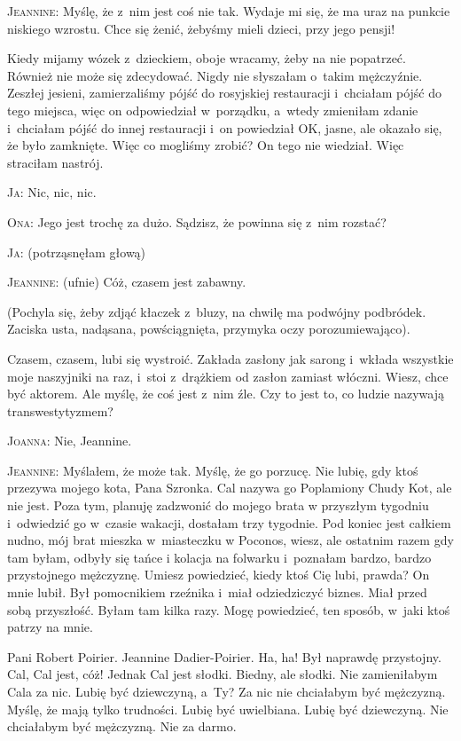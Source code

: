 \documentclass[oneside,polish,12pt,sfheadings]{mwbk}
\begin{document}
\textsc{Jeannine}: Myślę, że z~nim jest coś nie tak. Wydaje mi się, że ma uraz
na punkcie niskiego wzrostu. Chce się żenić, żebyśmy mieli dzieci,
przy jego pensji!

Kiedy mijamy wózek z~dzieckiem, oboje wracamy, żeby na nie popatrzeć.
Również nie może się zdecydować. Nigdy nie słyszałam o~takim mężczyźnie.
Zeszłej jesieni, zamierzaliśmy pójść do rosyjskiej restauracji i~chciałam
pójść do tego miejsca, więc on odpowiedział w~porządku, a~wtedy zmieniłam
zdanie i~chciałam pójść do innej restauracji i~on powiedział OK, jasne,
ale okazało się, że było zamknięte. Więc co mogliśmy zrobić? On tego
nie wiedział. Więc straciłam nastrój.

\textsc{Ja}: Nic, nic, nic.

\textsc{Ona}: Jego jest trochę za dużo. Sądzisz, że powinna się z~nim rozstać?

\textsc{Ja}: (potrząsnęłam głową)

\textsc{Jeannine}: (ufnie) Cóż, czasem jest zabawny.

(Pochyla się, żeby zdjąć kłaczek z~bluzy, na chwilę ma podwójny podbródek.
Zaciska usta, nadąsana, powściągnięta, przymyka oczy porozumiewająco).

Czasem, czasem, lubi się wystroić. Zakłada zasłony jak sarong i~wkłada
wszystkie moje naszyjniki na raz, i~stoi z~drążkiem od zasłon zamiast
włóczni. Wiesz, chce być aktorem. Ale myślę, że coś jest z~nim źle.
Czy to jest to, co ludzie nazywają transwestytyzmem?

\textsc{Joanna}: Nie, Jeannine.

\textsc{Jeannine}: Myślałem, że może tak. Myślę, że go porzucę. Nie lubię,
gdy ktoś przezywa mojego kota, Pana Szronka. Cal nazywa go Poplamiony
Chudy Kot, ale nie jest. Poza tym, planuję zadzwonić do mojego brata
w przyszłym tygodniu i~odwiedzić go w~czasie wakacji, dostałam trzy
tygodnie. Pod koniec jest całkiem nudno, mój brat mieszka w~miasteczku
w Poconos, wiesz, ale ostatnim razem gdy tam byłam, odbyły się tańce
i kolacja na folwarku i~poznałam bardzo, bardzo przystojnego mężczyznę.
Umiesz powiedzieć, kiedy ktoś Cię lubi, prawda? On mnie lubił. Był
pomocnikiem rzeźnika i~miał odziedziczyć biznes. Miał przed sobą przyszłość.
Byłam tam kilka razy. Mogę powiedzieć, ten sposób, w~jaki ktoś patrzy
na mnie.

Pani Robert Poirier. Jeannine Dadier-Poirier. Ha, ha! Był naprawdę
przystojny. Cal, Cal jest, cóż! Jednak Cal jest słodki. Biedny, ale
słodki. Nie zamieniłabym Cala za nic. Lubię być dziewczyną, a~Ty?
Za nic nie chciałabym być mężczyzną. Myślę, że mają tylko trudności.
Lubię być uwielbiana. Lubię być dziewczyną. Nie chciałabym być mężczyzną.
Nie za darmo.
\end{document}
